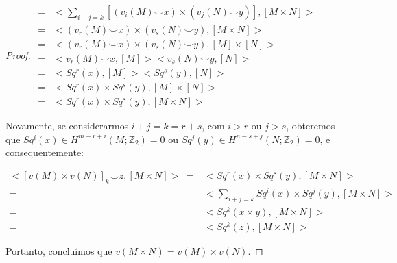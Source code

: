 \documentclass[12pt,oneside]{book} %
\newcommand{\ds}{\displaystyle}
\newcommand{\Z}{\mathbb{Z}}
\newcommand{\ccup}{\smile}
\begin{document}
\begin{proof}
	$\begin{array}{rl}
		= & <\ds\sum_{i+j=k}[(v_{i}(M)\ccup x)\times( v_{j}(N)\ccup y)],[M\times N]> \\
		= & <(v_{r}(M)\ccup x)\times (v_{s}(N)\ccup y),[M\times N]> \\
		= & <(v_{r}(M)\ccup x)\times (v_{s}(N)\ccup y),[M]\times [N]> \\
		= & <v_{r}(M)\ccup x,[M]><v_{s}(N)\ccup y,[N]> \\
		= & <Sq^{r}(x),[M]><Sq^{s}(y),[N]> \\
		= & <Sq^{r}(x)\times Sq^{s}(y),[M]\times [N]> \\
		= & <Sq^{r}(x)\times Sq^{s}(y),[M\times N]>
	\end{array}$ \newline 
	
	\par Novamente, se considerarmos $i+j=k=r+s$, com $i>r$ ou $j>s$, obteremos que $Sq^{i}(x)\in H^{m-r+i}(M;\Z_{2})=0$ ou $Sq^{j}(y)\in H^{n-s+j}(N;\Z_{2})=0$, e consequentemente: \newline 
	
	$\begin{array}{rl}
		<[v(M)\times v(N)]_{k}\ccup z,[M\times N]> \ = & <Sq^{r}(x)\times Sq^{s}(y),[M\times N]> \\
		= & <\ds\sum_{i+j=k}Sq^{i}(x)\times Sq^{j}(y),[M\times N]> \\
		= & <Sq^{k}(x\times y),[M\times N]> \\
		= & <Sq^{k}(z),[M\times N]>
	\end{array}$ \newline
	
	\par Portanto, concluímos que $v(M\times N)=v(M)\times v(N)$.
	
\end{proof}










\newpage

\thispagestyle{empty}
\printindex %

\end{document}
